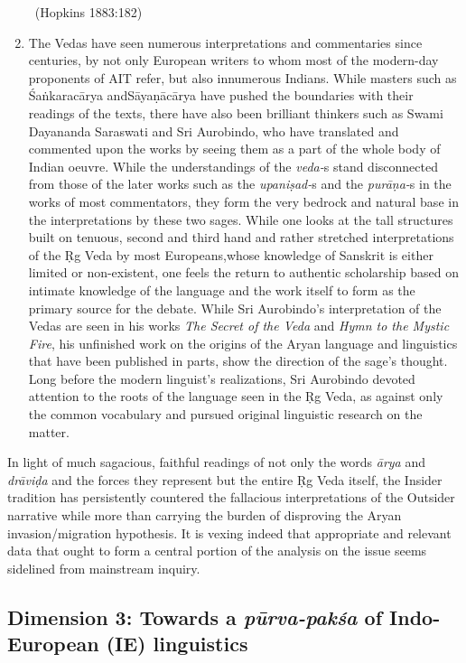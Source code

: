 \begin{enumerate}
\begin{myquote}
~\hfill (Hopkins 1883:182)
\end{myquote}


 \item The Vedas have seen numerous interpretations and commentaries since centuries, by not only European writers to whom most of the modern-day proponents of AIT refer, but also innumerous Indians. While masters such as Śaṅkaracārya and\break Sāyaṇācārya have pushed the boundaries with their readings of the texts, there have also been brilliant thinkers such as Swami Dayananda Saraswati and Sri Aurobindo, who have translated and commented upon the works by seeing them as a part of the whole body of Indian oeuvre. While the understandings of the \textit{veda-}s stand disconnected from those of the later works such as the \textit{upaniṣad-}s and the \textit{purāṇa-}s in the works of most commentators, they form the very bedrock and natural base in the interpretations by these two sages. While one looks at the tall structures built on tenuous, second and third hand and rather stretched interpretations of the Ṛg Veda by most Europeans,\break whose knowledge of Sanskrit is either limited or non-existent, one feels the return to authentic scholarship based on intimate knowledge of the language and the work itself to form as the primary source for the debate. While Sri Aurobindo’s interpretation of the Vedas are seen in his works \textit{The Secret of the Veda} and \textit{Hymn to the Mystic Fire}, his unfinished work on the origins of the Aryan language and linguistics that have been published in parts, show the direction of the sage’s thought. Long before the modern linguist’s realizations, Sri Aurobindo devoted attention to the roots of the language seen in the Ṛg Veda, as against only the common vocabulary and pursued original linguistic research on the matter.

\end{enumerate}

In light of much sagacious, faithful readings of not only the words \textit{ārya} and \textit{drāviḍa} and the forces they represent but the entire Ṛg Veda itself, the Insider tradition has persistently countered the fallacious interpretations of the Outsider narrative while more than carrying the burden of disproving the Aryan invasion/migration hypothesis. It is vexing indeed that appropriate and relevant data that ought to form a central portion of the analysis on the issue seems sidelined from mainstream inquiry.


\subsection{Dimension 3: Towards a \textit{pūrva-pakśa} of Indo-European (IE) linguistics}

